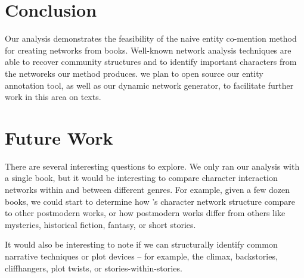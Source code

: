 \section{Conclusion}

Our analysis demonstrates the feasibility of the naive entity co-mention method for creating networks from books. Well-known network analysis techniques are able to recover community structures and to identify important characters from the networeks our method produces. we plan to open source our entity annotation tool, as well as our dynamic network generator, to facilitate further work in this area on texts.

\section{Future Work}

There are several interesting questions to explore. We only ran our analysis with a single book, but it would be interesting to compare character interaction networks within and between different genres. For example, given a few dozen books, we could start to determine how \infinitejest's character network structure compare to other postmodern works, or how postmodern works differ from others like mysteries, historical fiction, fantasy, or short stories.

It would also be interesting to note if we can structurally identify common narrative techniques or plot devices -- for example, the climax, backstories, cliffhangers, plot twists, or stories-within-stories.



